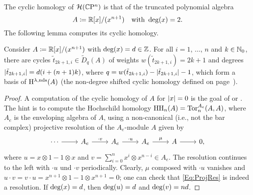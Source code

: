 \documentclass[\MainFolder/Text.tex]{subfiles}
\begin{document}
The cyclic homology of $\mathcal{H}(\mathbb{C}\mathrm{P}^n)$ is that of the truncated polynomial algebra
\[ A \coloneqq\mathbb{R}[x]/(x^{n+1})\quad\text{with }\operatorname{deg}(x)=2. \]
The following lemma computes its cyclic homology.
\begin{Lemma}
Consider $A\coloneqq\mathbb{R}[x]/(x^{n+1})$ with $\operatorname{deg}(x)=d\in \mathbb{Z}$. For all $i=1$, $\dotsc$, $n$ and $k\in \mathbb{N}_0$, there are cycles $\tilde{t}_{2k+1,i}\in  \tilde{D}_q(A)$ of weights $w(\tilde{t}_{2k+1,i}) = 2k+1$ and degrees $|\tilde{t}_{2k+1,i}| = d(i+(n+1)k)$, where $q = w(\tilde{t}_{2k+1,i})-|\tilde{t}_{2k+1,i}|-1$, which form a basis of $\mathrm{H}^{\lambda,\mathrm{nds}}(A)$ (the non-degree shifted cyclic homology defined on page~\pageref{Eq:NDSComplex}).
\end{Lemma}
\begin{proof}
A computation of the cyclic homology of $A$ for $|x|=0$ is the goal of \cite[Exercise 4.1.8.]{LodayCyclic} or \cite[Exercise 9.1.1]{Weibel1994}.
The hint is to compute the Hochschild homology $\mathrm{H}\mathrm{H}_n(A) = \operatorname{Tor}_n^{A_e}(A,A)$, where $A_e$ is the enveloping algebra of $A$, using a non-canonical (i.e., not the bar complex) projective resolution of the $A_e$-module $A$ given by
\begin{equation}\label{Eq:ProjRes}
\begin{tikzcd}
\dotsb \arrow[r] & A_e \arrow{r}{\cdot v} & A_e \arrow{r}{\cdot u} & A_e \arrow{r}{\mu} & A \arrow{r} & 0,
\end{tikzcd}
\end{equation}
where $u = x \otimes 1 - 1 \otimes x$ and $v = \sum_{i=0}^{n} x^i \otimes x^{n-i}\in A_e$.
The resolution continues to the left with $\cdot u$ und $\cdot v$ periodically.
Clearly, $\mu$ composed with $\cdot u$ vanishes and $u\cdot v = v\cdot u = x^{n+1}\otimes 1 - 1 \otimes x^{n+1} = 0$; one can check that \eqref{Eq:ProjRes} is indeed a resolution.
If $\operatorname{deg}(x)=d$, then $\operatorname{deg}(u) = d$ and $\operatorname{deg}(v) = n d$.


\end{proof}
\end{document}
